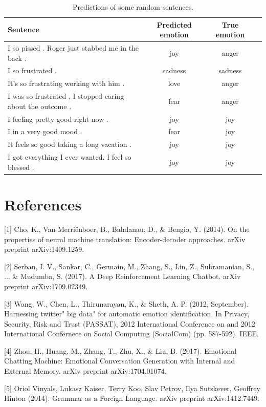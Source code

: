 \documentclass{article}
\begin{document}
\begin{table}[tbph]
\centering  %
\begin{tabular}{lccc}  %
\hline
Sentence &Predicted emotion &True emotion\\ \hline  %
I so pissed . Roger just stabbed me in the back . &joy &anger \\         %
I so frustrated . &sadness &sadness \\        %
It's so frustrating working with him . &love &anger\\ 
I was so frustrated , I stopped caring about the outcome . &fear &anger \\
I feeling pretty good right now . &joy &joy \\
I in a very good mood . &fear &joy \\
It feels so good taking a long vacation . &joy &joy \\
I got everything I ever wanted. I feel so blessed . &joy &joy \\ \hline
\end{tabular}
\caption{Predictions of some random sentences.}
\label{sentence}
\end{table}


















\newpage

\section*{References}

[1] Cho, K., Van Merriënboer, B., Bahdanau, D., \& Bengio, Y. (2014). On the properties of neural machine translation: Encoder-decoder approaches. arXiv preprint arXiv:1409.1259.


[2] Serban, I. V., Sankar, C., Germain, M., Zhang, S., Lin, Z., Subramanian, S., ... \& Mudumba, S. (2017). A Deep Reinforcement Learning Chatbot. arXiv preprint arXiv:1709.02349.

[3] Wang, W., Chen, L., Thirunarayan, K., \& Sheth, A. P. (2012, September). Harnessing twitter" big data" for automatic emotion identification. In Privacy, Security, Risk and Trust (PASSAT), 2012 International Conference on and 2012 International Confernece on Social Computing (SocialCom) (pp. 587-592). IEEE.

[4] Zhou, H., Huang, M., Zhang, T., Zhu, X., \& Liu, B. (2017). Emotional Chatting Machine: Emotional Conversation Generation with Internal and External Memory. arXiv preprint arXiv:1704.01074.

[5] Oriol Vinyals, Lukasz Kaiser, Terry Koo, Slav Petrov, Ilya Sutskever, Geoffrey Hinton (2014). Grammar as a Foreign Language. arXiv preprint arXiv:1412.7449. 
\end{document}
